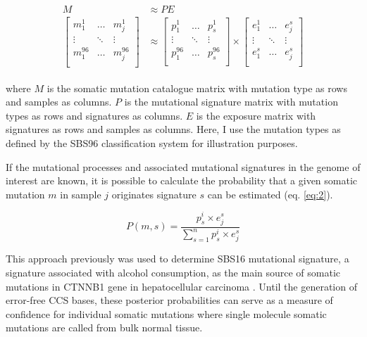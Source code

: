 \begin{align}
\begin{split} 
M &\approx PE \label{eq:1} \\
\begin{bmatrix}
    m^{1}_{1} & \dots & m^{1}_{j} \\
    \vdots & \ddots & \vdots \\
    m^{96}_{1} & \dots & m^{96}_{j} \\
\end{bmatrix} &\approx
\begin{bmatrix}
    p^{1}_{1} & \dots & p^{1}_{s} \\
    \vdots & \ddots & \vdots \\
    p^{96}_{1} & \dots & p^{96}_{s} \\
\end{bmatrix} \times
\begin{bmatrix}
    e^{1}_{1} & \dots & e^{s}_{j} \\
    \vdots & \ddots & \vdots \\
    e^{s}_{1} & \dots & e^{s}_{j} \\
\end{bmatrix} 
\end{split}
\end{align}

where $M$ is the somatic mutation catalogue matrix with mutation type as rows and samples as columns. $P$ is the mutational signature matrix with mutation types as rows and signatures as columns. $E$ is the exposure matrix with signatures as rows and samples as columns. Here, I use the mutation types as defined by the SBS96 classification system for illustration purposes.

If the mutational processes and associated mutational signatures in the genome of interest are known, it is possible to calculate the probability that a given somatic mutation $m$ in sample $j$ originates signature $s$ can be estimated (eq. \ref{eq:2}). 

\begin{equation} \label{eq:2} 
P(m,s) = \frac{p^{i}_{s} \times e^{s}_{j}}{\sum^{n}_{s=1}p^{i}_{s} \times e^{s}_{j}}
\end{equation}

This approach previously was used to determine SBS16 mutational signature, a signature associated with alcohol consumption, as the main source of somatic mutations in CTNNB1 gene in hepatocellular carcinoma \cite{}. Until the generation of error-free CCS bases, these posterior probabilities can serve as a measure of confidence for individual somatic mutations where single molecule somatic mutations are called from bulk normal tissue. 

